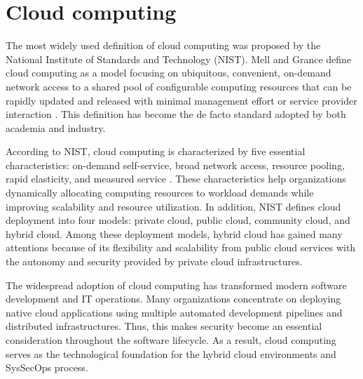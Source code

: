 \section{Cloud computing}
\label{sec:cloud_computing}

The most widely used definition of cloud computing was proposed by the National Institute of Standards and Technology (NIST). Mell and Grance define cloud computing as a model focusing on ubiquitous, convenient, on-demand network access to a shared pool of configurable computing resources that can be rapidly updated and released with minimal management effort or service provider interaction \cite{Mell2011NIST}. This definition has become the de facto standard adopted by both academia and industry.

According to NIST, cloud computing is characterized by five essential characteristics: on-demand self-service, broad network access, resource pooling, rapid elasticity, and measured service \cite{Mell2011NIST}. These characteristics help organizations dynamically allocating computing resources to workload demands while improving scalability and resource utilization. In addition, NIST defines cloud deployment into four models: private cloud, public cloud, community cloud, and hybrid cloud. Among these deployment models, hybrid cloud has gained many attentions because of its flexibility and scalability from public cloud services with the autonomy and security provided by private cloud infrastructures.

The widespread adoption of cloud computing has transformed modern software development and IT operations. Many organizations concentrate on deploying native cloud applications using multiple automated development pipelines and distributed infrastructures. Thus, this makes security become an essential consideration throughout the software lifecycle. As a result, cloud computing serves as the technological foundation for the hybrid cloud environments and SysSecOps process.